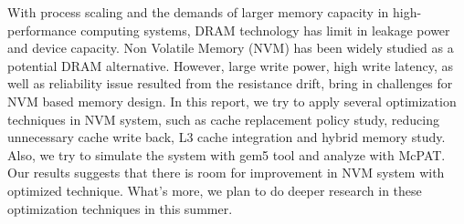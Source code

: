



With process scaling and the demands of larger memory capacity in high-performance computing systems, DRAM technology has limit in leakage power and device capacity. Non Volatile Memory (NVM) has been widely studied as a potential DRAM alternative. However, large write power, high write latency, as well as reliability issue resulted from the resistance drift, bring in challenges for NVM based memory design. In this report, we try to apply several optimization techniques in NVM system, such as  cache replacement policy study, reducing unnecessary cache write back, L3 cache integration and hybrid memory study. Also, we try to simulate the system with gem5 tool and analyze with McPAT. Our results suggests that there is room for improvement in NVM system with optimized technique. What's more, we plan to do deeper research in these optimization techniques in this summer. 











